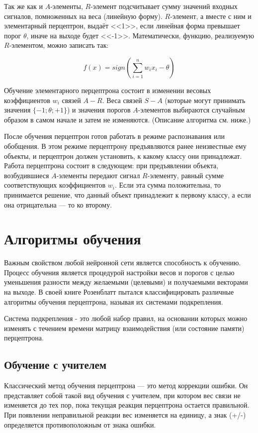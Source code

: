Так же как и $A$-элементы, $R$-элемент подсчитывает сумму значений входных сигналов, помноженных на веса (линейную форму). $R$-элемент, а вместе с ним и элементарный перцептрон, выдаёт <<1>>, если линейная форма превышает порог $\theta$, иначе на выходе будет <<-1>>. Математически, функцию, реализуемую $R$-элементом, можно записать так:

    $$f(x) = sign(\sum_{i=1}^{n} w_i x_i - \theta)$$

Обучение элементарного перцептрона состоит в изменении весовых коэффициентов $w_i$ связей $A-R$. Веса связей $S-A$ (которые могут принимать значения $\{-1; \theta; +1\}$) и значения порогов $A$-элементов выбираются случайным образом в самом начале и затем не изменяются. (Описание алгоритма см. ниже.)

После обучения перцептрон готов работать в режиме распознавания или обобщения. В этом режиме перцептрону предъявляются ранее неизвестные ему объекты, и перцептрон должен установить, к какому классу они принадлежат. Работа перцептрона состоит в следующем: при предъявлении объекта, возбудившиеся $A$-элементы передают сигнал $R$-элементу, равный сумме соответствующих коэффициентов $w_i$. Если эта сумма положительна, то принимается решение, что данный объект принадлежит к первому классу, а если она отрицательна — то ко второму.

\section{Алгоритмы обучения}
Важным свойством любой нейронной сети является способность к обучению. Процесс обучения является процедурой настройки весов и порогов с целью уменьшения разности между желаемыми (целевыми) и получаемыми векторами на выходе. В своей книге Розенблатт пытался классифицировать различные алгоритмы обучения перцептрона, называя их системами подкрепления.

Система подкрепления - это любой набор правил, на основании которых можно изменять с течением времени матрицу взаимодействия (или состояние памяти) перцептрона.

\subsection{Обучение с учителем}

Классический метод обучения перцептрона — это метод коррекции ошибки. Он представляет собой такой вид обучения с учителем, при котором вес связи не изменяется до тех пор, пока текущая реакция перцептрона остается правильной. При появлении неправильной реакции вес изменяется на единицу, а знак (+/-) определяется противоположным от знака ошибки.

